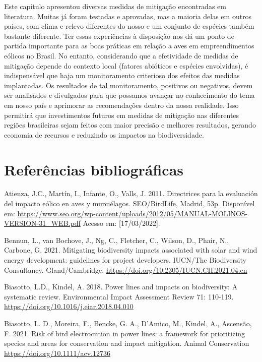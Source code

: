 \documentclass[
  oneside]{scrbook}
\begin{document}
Este capítulo apresentou diversas medidas de mitigação encontradas em literatura. Muitas já foram testadas e aprovadas, mas a maioria delas em outros países, com clima e relevo diferentes do nosso e um conjunto de espécies também bastante diferente. Ter essas experiências à disposição nos dá um ponto de partida importante para as boas práticas em relação a aves em empreendimentos eólicos no Brasil. No entanto, considerando que a efetividade de medidas de mitigação depende do contexto local (fatores abióticos e espécies envolvidas), é indispensável que haja um monitoramento criterioso dos efeitos das medidas implantadas. Os resultados de tal monitoramento, positivos ou negativos, devem ser analisados e divulgados para que possamos avançar no conhecimento do tema em nosso país e aprimorar as recomendações dentro da nossa realidade. Isso permitirá que investimentos futuros em medidas de mitigação nas diferentes regiões brasileiras sejam feitos com maior precisão e melhores resultados, gerando economia de recursos e reduzindo os impactos na biodiversidade.

\hypertarget{referuxeancias-bibliogruxe1ficas-4}{%
\section{Referências bibliográficas}\label{referuxeancias-bibliogruxe1ficas-4}}

Atienza, J.C., Martín, I., Infante, O., Valls, J. 2011. Directrices para la evaluación del impacto eólico en aves y murciélagos. SEO/BirdLife, Madrid, 53p. Disponível em: \url{https://www.seo.org/wp-content/uploads/2012/05/MANUAL-MOLINOS-VERSION-31_WEB.pdf} Acesso em: {[}17/03/2022{]}.

Bennun, L., van Bochove, J., Ng, C., Fletcher, C., Wilson, D., Phair, N., Carbone, G. 2021. Mitigating biodiversity impacts associated with solar and wind energy development: guidelines for project developers. IUCN/The Biodiversity Consultancy. Gland/Cambridge. \url{https://doi.org/10.2305/IUCN.CH.2021.04.en}

Biasotto, L.D., Kindel, A. 2018. Power lines and impacts on biodiversity: A systematic review. Environmental Impact Assessment Review 71: 110-119. \url{https://doi.org/10.1016/j.eiar.2018.04.010}

Biasotto, L. D., Moreira, F., Bencke, G. A., D'Amico, M., Kindel, A., Ascensão, F. 2021. Risk of bird electrocution in power lines: a framework for prioritizing species and areas for conservation and impact mitigation. Animal Conservation \url{https://doi.org/10.1111/acv.12736}
\end{document}
